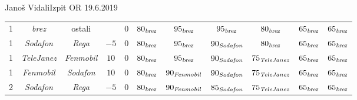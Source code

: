\begin{naloga}{Janoš Vidali}{Izpit OR 19.6.2019}
\begin{odgovor}
\begin{enumerate}[(a)]
\begin{tabela}
{\begin{tabular}{c|ccc|ccccccc}
1 & {\sl brez} & {ostali} && $0$ &
$80_{\text{\sl brez}}$ & $95_{\text{\sl brez}}$ & $95_{\text{\sl brez}}$ &
$80_{\text{\sl brez}}$ & $65_{\text{\sl brez}}$ & $65_{\text{\sl brez}}$ \\
1 & {\em Sodafon} & {\em Rega} & $-5$ & $0$ &
$80_{\text{\sl brez}}$ & $95_{\text{\sl brez}}$ & $90_{\text{\em Sodafon}}$ &
$80_{\text{\sl brez}}$ & $65_{\text{\sl brez}}$ & $65_{\text{\sl brez}}$ \\
1 & {\em TeleJanez} & {\em Fenmobil} & $10$ & $0$ &
$80_{\text{\sl brez}}$ & $95_{\text{\sl brez}}$ & $90_{\text{\em Sodafon}}$ &
$75_{\text{\em TeleJanez}}$ & $65_{\text{\sl brez}}$ & $65_{\text{\sl brez}}$ \\
1 & {\em Fenmobil} & {\em Sodafon} & $10$ & $0$ &
$80_{\text{\sl brez}}$ & $90_{\text{\em Fenmobil}}$ & $90_{\text{\em Sodafon}}$ &
$75_{\text{\em TeleJanez}}$ & $65_{\text{\sl brez}}$ & $65_{\text{\sl brez}}$ \\
2 & {\em Sodafon} & {\em Rega} & $-5$ & $0$ &
$80_{\text{\sl brez}}$ & $90_{\text{\em Fenmobil}}$ & $85_{\text{\em Sodafon}}$ &
$75_{\text{\em TeleJanez}}$ & $65_{\text{\sl brez}}$ & $65_{\text{\sl brez}}$ \\
\end{tabular}
}
\end{tabela}
\end{enumerate}
\end{odgovor}
\end{naloga}

